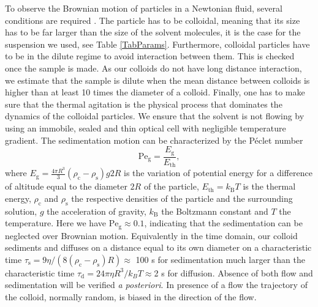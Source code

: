 \documentclass[%
 aip,
 jmp,%
 amsmath,amssymb,
reprint,%
]{revtex4-1}
\begin{document}
To observe the Brownian motion of particles in a Newtonian fluid, several conditions are required \citep{16_CollSusp}. The particle has to be colloidal, meaning that its size has to be far larger than the size of the solvent molecules, it is the case for the suspension we used, see Table \ref{TabParams}. Furthermore, colloidal particles have to be in the dilute regime to avoid interaction between them. This is checked once the sample is made. As our colloids do not have long distance interaction, we estimate that the sample is dilute when the mean distance between colloids is higher than at least 10 times the diameter of a colloid. Finally, one has to make sure that the thermal agitation is the physical process that dominates the dynamics of the colloidal particles. We ensure that the solvent is not flowing by using an immobile, sealed and thin optical cell with negligible temperature gradient. The sedimentation motion can be characterized by the P\'eclet number \citep{12_patankar1980numerical}
\begin{equation}
\text{Pe}_\text{g} = \frac{E_\text{g}}{E_\text{th}},
\end{equation}
where $E_\text{g} = \frac{4 \pi R^3}{3}  (\rho_\text{c} - \rho_\text{s}) g  2R$ is the variation of potential energy for a difference of altitude equal to the diameter $2R$ of the particle, $E_\text{th} = k_\text{B} T$ is the thermal energy, $\rho_\text{c}$ and $\rho_\text{s}$ the respective densities of the particle and the surrounding solution, $g$ the acceleration of gravity, $k_\text{B}$ the Boltzmann constant and $T$ the temperature. Here we have $\text{Pe}_\text{g} \approx 0.1$, indicating that the sedimentation can be neglected over Brownian motion. Equivalently in the time domain, our colloid sediments and diffuses on a distance equal to its own diameter on a characteristic time $\tau_\text{s}=9\eta/(8(\rho_\text{c}-\rho_\text{s}) R)\approx$ 100 s for sedimentation much larger than the characteristic time $\tau_\text{d}=24\pi\eta R^3/k_BT\approx$2 s for diffusion. Absence of both flow and sedimentation will be verified \textit{a posteriori}. In presence of a flow the trajectory of the colloid, normally random, is biased in the direction of the flow.
\end{document}
